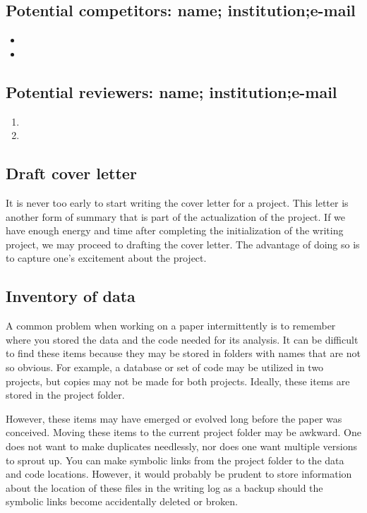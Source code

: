 \documentclass[10pt,letterpaper]{article}
\newcommand{\bi}{\begin{itemize}}
\newcommand{\ei}{\end{itemize}}
\newcommand{\be}{\begin{enumerate}}
\newcommand{\ee}{\end{enumerate}}
\begin{document}
\subsection{Potential competitors: name; institution;e-mail}
\label{sub:competitors}

\bi
\item
\item 
\ei



\subsection{Potential reviewers: name; institution;e-mail}
\label{sub:reviewers}

\be
    \item 
    \item
\ee


\subsection{Draft cover letter}
\label{sub:coverletter}

It is never too early to start writing the cover letter for a project.
This letter is another form of summary that is part of the actualization of the project.
If we have enough energy and time after completing the initialization of the writing project, we may proceed to drafting the cover letter.
The advantage of doing so is to capture one's excitement about the project.

\subsection*{Inventory of data}

A common problem when working on a paper intermittently is to remember where you stored the data and the code needed for its analysis.
It can be difficult to find these items because they may be stored in folders with names that are not so obvious.
For example, a database or set of code may be utilized in two projects, but copies may not be made for both projects.
Ideally, these items are stored in the project folder.

However, these items may have emerged or evolved long before the paper was conceived. 
Moving these items to the current project folder may be awkward.
One does not want to make duplicates needlessly, nor does one want multiple versions to sprout up.
You can make symbolic links from the project folder to the data and code locations. 
However, it would probably be prudent to store information about the location of these files in the writing log as a backup should the symbolic links become accidentally deleted or broken.
\end{document}
